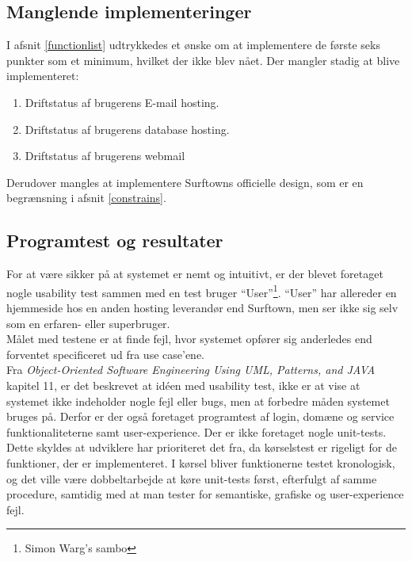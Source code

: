 \documentclass[12pt]{article}
\begin{document}
\subsection*{Manglende implementeringer}
I afsnit \ref{functionlist} udtrykkedes et ønske om at implementere de første seks punkter som et minimum, hvilket der ikke blev nået. Der mangler stadig at blive implementeret:
\begin{enumerate}
	\item Driftstatus af brugerens E-mail hosting.
	\item Driftstatus af brugerens database hosting.
	\item Driftstatus af brugerens webmail
\end{enumerate}
Derudover mangles at implementere Surftowns officielle design, som er en begrænsning i afsnit \ref{constrains}.


\subsection{Programtest og resultater}
For at være sikker på at systemet er nemt og intuitivt, er der blevet foretaget nogle usability test sammen med en test bruger ``User''\footnote{Simon Warg's sambo}. ``User'' har allereder en hjemmeside hos en anden hosting leverandør end Surftown, men ser ikke sig selv som en erfaren- eller superbruger.\\
Målet med testene er at finde fejl, hvor systemet opfører sig anderledes end forventet specificeret ud fra use case'ene.\\
Fra \emph{Object-Oriented Software Engineering Using UML, Patterns, and JAVA}\cite{OOSE} kapitel 11, er det beskrevet at idéen med usability test, ikke er at vise at systemet ikke indeholder nogle fejl eller bugs, men at forbedre måden systemet bruges på. Derfor er der også foretaget programtest af login, domæne og service funktionaliteterne samt user-experience. Der er ikke foretaget nogle unit-tests. Dette skyldes at udviklere har prioriteret det fra, da kørselstest er rigeligt for de funktioner, der er implementeret. I kørsel bliver funktionerne testet kronologisk, og det ville være dobbeltarbejde at køre unit-tests først, efterfulgt af samme procedure, samtidig med at man tester for semantiske, grafiske og user-experience fejl.
\end{document}
